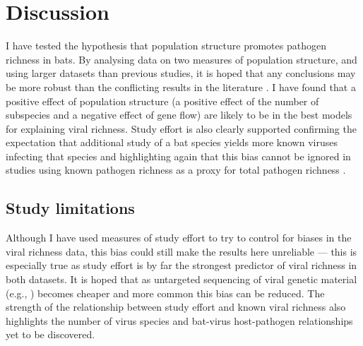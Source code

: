 
\section{Discussion}  



I have tested the hypothesis that population structure promotes pathogen richness in bats.
By analysing data on two measures of population structure, and using larger datasets than previous studies, it is hoped that any conclusions may be more robust than the conflicting results in the literature \cite{gay2014parasite, turmelle2009correlates, maganga2014bat}.
I have found that a positive effect of population structure (a positive effect of the number of subspecies and a negative effect of gene flow) are likely to be in the best models for explaining viral richness.
Study effort is also clearly supported confirming the expectation that additional study of a bat species yields more known viruses infecting that species and highlighting again that this bias cannot be ignored in studies using known pathogen richness as a proxy for total pathogen richness \cite{}.


\subsection{Study limitations}

Although I have used measures of study effort to try to control for biases in the viral richness data, this bias could still make the results here unreliable --- this is especially true as study effort is by far the strongest predictor of viral richness in both datasets.
It is hoped that as untargeted sequencing of viral genetic material (e.g., \textcite{anthony2013strategy}) becomes cheaper and more common this bias can be reduced.
The strength of the relationship between study effort and known viral richness also highlights the number of virus species and bat-virus host-pathogen relationships yet to be discovered.


